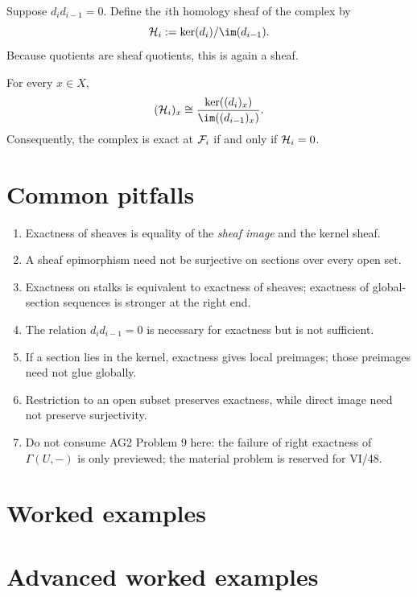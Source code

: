 Suppose $d_i d_{i-1}=0$.  Define the $i$th homology sheaf of the complex by
\[
\HH_i:=\ker(d_i)/\im(d_{i-1}).
\]
Because quotients are sheaf quotients, this is again a sheaf.

\begin{theorem}
For every $x\in X$,
\[
(\HH_i)_x\cong
\frac{\ker((d_i)_x)}{\im((d_{i-1})_x)}.
\]
Consequently, the complex is exact at $\mathcal F_i$ if and only if $\mathcal H_i=0$.
\end{theorem}



\section{Common pitfalls}
\begin{enumerate}
\item Exactness of sheaves is equality of the \emph{sheaf image} and the kernel sheaf.
\item A sheaf epimorphism need not be surjective on sections over every open set.
\item Exactness on stalks is equivalent to exactness of sheaves; exactness of global-section
sequences is stronger at the right end.
\item The relation $d_i d_{i-1}=0$ is necessary for exactness but is not sufficient.
\item If a section lies in the kernel, exactness gives local preimages; those preimages need
not glue globally.
\item Restriction to an open subset preserves exactness, while direct image need not preserve
surjectivity.
\item Do not consume AG2 Problem 9 here: the failure of right exactness of $\Gamma(U,-)$ is
only previewed; the material problem is reserved for VI/48.
\end{enumerate}

\section{Worked examples}


\section{Advanced worked examples}


